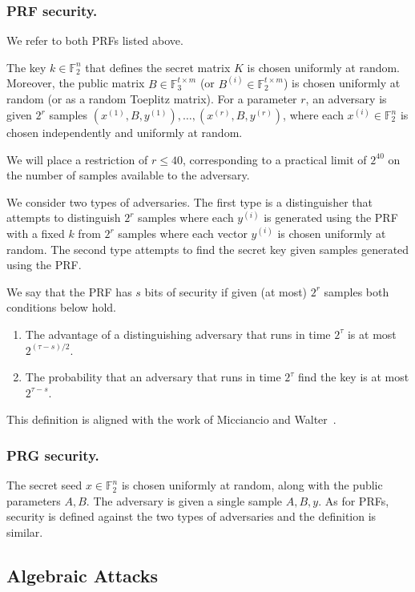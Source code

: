 \documentclass[orivec,envcountsect]{llncs}
\begin{document}
\subsubsection{PRF security.}

We refer to both PRFs listed above.

The key $k \in \mathbb{F}_2^n$ that defines the secret matrix $K$ is chosen uniformly at random.
Moreover, the public matrix
$B \in \mathbb{F}_3^{t \times m}$ (or $B^{(i)} \in \mathbb{F}_2^{t \times m}$) is chosen uniformly at random
(or as a random Toeplitz matrix).
For a parameter $r$, an adversary is given $2^{r}$ samples $(x^{(1)},B,y^{(1)}) ,\ldots, (x^{(r)},B,y^{(r)})$,
where each $x^{(i)} \in \mathbb{F}_2^n$ is chosen independently and uniformly at random.

We will place a restriction of $r \leq 40$,
corresponding to a practical limit of $2^{40}$ on the number of samples available to the adversary.

We consider two types of adversaries.
The first type is a distinguisher that attempts to distinguish $2^r$ samples where each $y^{(i)}$
is generated using the PRF with a fixed $k$ from
$2^r$ samples where each vector $y^{(i)}$ is chosen uniformly at random.
The second type attempts to find the secret key given samples generated using the PRF.

We say that the PRF has $s$ bits of security if given (at most) $2^r$ samples both conditions below hold.
\begin{enumerate}
  \item The advantage of a distinguishing adversary that runs in time $2^\tau$ is at most $2^{(\tau - s)/2}$.
  \item The probability that an adversary that runs in time $2^\tau$ find the key is at most $2^{\tau - s}$.
\end{enumerate}
This definition is aligned with the work of Micciancio and Walter~\cite{Micciancio018}.


\subsubsection{PRG security.}

The secret seed $x \in \mathbb{F}_2^n$ is chosen uniformly at random, along with the public parameters $A,B$.
The adversary is given a single sample $A,B,y$.
As for PRFs, security is defined against the two types of adversaries and the definition is similar.

\subsection{Algebraic Attacks}
\end{document}
